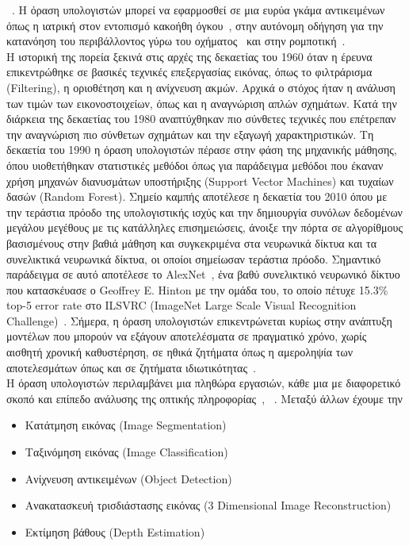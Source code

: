 \documentclass[12pt]{article}
\numberwithin{equation}{section}
\begin{document}
\noindent ~\cite{Gao_2020}. Η όραση υπολογιστών μπορεί να εφαρμοσθεί σε μια ευρύα γκάμα αντικειμένων όπως η ιατρική στον εντοπισμό κακοήθη όγκου~\cite{Esteva2021}, στην αυτόνομη οδήγηση για την κατανόηση του περιβάλλοντος γύρω του οχήματος~\cite{unknown1} και στην ρομποτική~\cite{article1}. \\

Η ιστορική της πορεία ξεκινά στις αρχές της δεκαετίας του 1960 όταν η έρευνα επικεντρώθηκε σε βασικές τεχνικές επεξεργασίας εικόνας, όπως το φιλτράρισμα (Filtering), η οριοθέτηση και η ανίχνευση ακμών. Αρχικά ο στόχος ήταν η ανάλυση των τιμών των εικονοστοιχείων, όπως και η αναγνώριση απλών σχημάτων. Κατά την διάρκεια της δεκαετίας του 1980 αναπτύχθηκαν πιο σύνθετες τεχνικές που επέτρεπαν την αναγνώριση πιο σύνθετων σχημάτων και την εξαγωγή χαρακτηριστικών. Τη δεκαετία του 1990 η όραση υπολογιστών πέρασε στην φάση της μηχανικής μάθησης, όπου υιοθετήθηκαν στατιστικές μεθόδοι όπως για παράδειγμα μεθόδοι που έκαναν χρήση μηχανών διανυσμάτων υποστήριξης (Support Vector Machines) και τυχαίων δασών (Random Forest). Σημείο καμπής αποτέλεσε η δεκαετία του 2010 όπου με την τεράστια πρόοδο της υπολογιστικής ισχύς και την δημιουργία συνόλων δεδομένων μεγάλου μεγέθους με τις κατάλληλες επισημειώσεις, άνοιξε την πόρτα σε αλγορίθμους βασισμένους στην βαθιά μάθηση και συγκεκριμένα στα νευρωνικά δίκτυα και τα συνελικτικά νευρωνικά δίκτυα, οι οποίοι σημείωσαν τεράστια πρόοδο. Σημαντικό παράδειγμα σε αυτό αποτέλεσε το AlexNet~\cite{NIPS2012_c399862d}, ένα βαθύ συνελικτικό νευρωνικό δίκτυο που κατασκέυασε ο Geoffrey E. Hinton με την ομάδα του, το οποίο πέτυχε 15.3\% top-5 error rate στο ILSVRC (ImageNet
Large Scale Visual Recognition Challenge)~\cite{russakovsky2015imagenetlargescalevisual}. Σήμερα, η όραση υπολογιστών επικεντρώνεται κυρίως στην ανάπτυξη μοντέλων που μπορούν να εξάγουν αποτελέσματα σε πραγματικό χρόνο, χωρίς αισθητή χρονική καθυστέρηση, σε ηθικά ζητήματα όπως η αμεροληψία των αποτελεσμάτων όπως και σε ζητήματα ιδιωτικότητας~\cite{article2}. \\

Η όραση υπολογιστών περιλαμβάνει μια πληθώρα εργασιών, κάθε μια με διαφορετικό σκοπό και επίπεδο ανάλυσης της οπτικής πληροφορίας~\cite{boesch2024computer}, ~\cite{zhou2024comprehensive}. Μεταξύ άλλων έχουμε την

\begin{itemize}
    \item Κατάτμηση εικόνας (Image Segmentation)
    \item Ταξινόμηση εικόνας (Image Classification)
    \item Ανίχνευση αντικειμένων (Object Detection)
    \item Ανακατασκευή τρισδιάστασης εικόνας (3 Dimensional Image Reconstruction)
    \item Εκτίμηση βάθους (Depth Estimation) 
\end{itemize}
\end{document}

